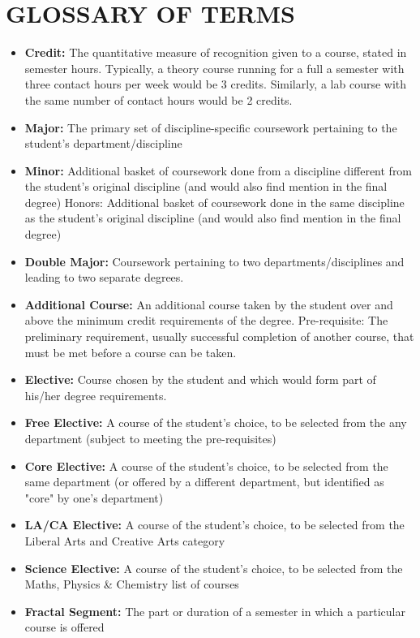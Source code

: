 

\section{GLOSSARY OF TERMS }
\begin{itemize}
\item {\bf Credit:} The quantitative measure of recognition given to a course, stated in semester hours. Typically, a theory course running for a full a semester with three contact hours per week would be 3 credits. Similarly, a lab course with the same number of contact hours would be 2 credits.  
\item {\bf Major:} The primary set of discipline-specific coursework pertaining to the student’s department/discipline  
\item {\bf Minor:} Additional basket of coursework done from a discipline different from the student’s original discipline (and would also find mention in the final degree)
Honors: Additional basket of coursework done in the same discipline as the student’s original discipline (and would also find mention in the final degree)
\item {\bf Double Major:} Coursework pertaining to two departments/disciplines and leading to two separate degrees.
\item {\bf Additional Course:} An additional course taken by the student over and above the minimum credit requirements of the degree. 
Pre-requisite: The preliminary requirement, usually successful completion of another course, that must be met before a course can be taken.
\item {\bf Elective:} Course chosen by the student and which would form part of his/her degree requirements. 
\item {\bf Free Elective:} A course of the student’s choice, to be selected from the any department (subject to meeting the pre-requisites) 
\item {\bf Core Elective:} A course of the student’s choice, to be selected from the same department (or offered by a different department, but identified as "core" by one's department)
\item {\bf LA/CA Elective:} A course of the student’s choice, to be selected from the Liberal Arts and Creative Arts category 
\item {\bf Science Elective:} A course of the student’s choice, to be selected from the Maths, Physics \& Chemistry list of courses
\item {\bf Fractal Segment:} The part or duration of a semester in which a particular course is offered
\end{itemize}

